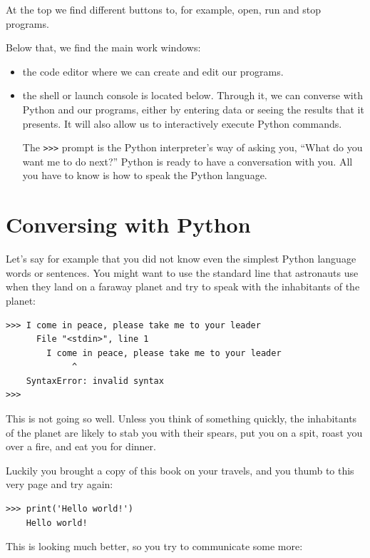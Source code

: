At the top we find different buttons to, for example, open, run and stop programs.

Below that, we find the main work windows:

\begin{itemize}[nosep]
 \item the code editor where we can create and edit our programs.
 \item the shell or launch console is located below. Through it, we can converse with Python and our programs, either by entering data or seeing the results that it presents. It will also allow us to interactively execute Python commands.
 
 The \verb|>>>| prompt is the Python interpreter's way of asking you, ``What do you want me to do next?'' Python is ready to have a conversation with you. All you have to know is how to speak the Python language.
\end{itemize}


\hypertarget{conversando-con-python}{%
\section{Conversing with Python}\label{conversando-con-python}}


Let's say for example that you did not know even the simplest Python language words or sentences. You might want to use the standard line that astronauts use when they land on a faraway planet and try to speak with the inhabitants of the planet:

\begin{Verbatim}[frame=single]
>>> I come in peace, please take me to your leader
      File "<stdin>", line 1
        I come in peace, please take me to your leader
             ^
    SyntaxError: invalid syntax
>>>
\end{Verbatim}


This is not going so well. Unless you think of something quickly, the inhabitants of the planet are likely to stab you with their spears, put you on a spit, roast you over a fire, and eat you for dinner.

Luckily you brought a copy of this book on your travels, and you thumb to this very page and try again:

\begin{Verbatim}[frame=single]
>>> print('Hello world!')
    Hello world!
\end{Verbatim}

This is looking much better, so you try to communicate some more:

